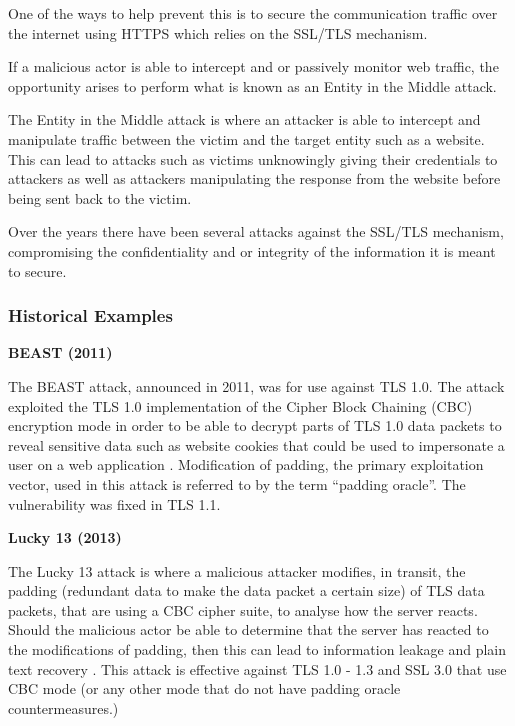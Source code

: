 \documentclass{mscreport}
\begin{document}
\vspace{0.3cm} \noindent
One of the ways to help prevent this is to secure the communication traffic over the internet using HTTPS which relies on the SSL/TLS mechanism.

\vspace{0.3cm} \noindent
If a malicious actor is able to intercept and or passively monitor web traffic, the opportunity arises to perform what is known as an Entity in the Middle attack.

\vspace{0.3cm} \noindent
The Entity in the Middle attack is where an attacker is able to intercept and manipulate traffic between the victim and the target entity such as a website. This can lead to attacks such as victims unknowingly giving their credentials to attackers as well as attackers manipulating the response from the website before being sent back to the victim.

\vspace{0.3cm} \noindent
Over the years there have been several attacks against the SSL/TLS mechanism, compromising the confidentiality and or integrity of the information it is meant to secure.

\subsubsection{Historical Examples}
\textbf{BEAST (2011)}

\vspace{0.2cm} \noindent
The BEAST attack, announced in 2011, was for use against TLS 1.0. The attack exploited the TLS 1.0 implementation of the Cipher Block Chaining (CBC) encryption mode in order to be able to decrypt parts of TLS 1.0 data packets to reveal sensitive data such as website cookies that could be used to impersonate a user on a web application \cite{Ristic2017-aj,Levillain2015-os}. Modification of padding, the primary exploitation vector, used in this attack is referred to by the term ``padding oracle''. The vulnerability was fixed in TLS 1.1.


\vspace{0.6cm} \noindent
\textbf{Lucky 13 (2013)}


\vspace{0.2cm} \noindent
The Lucky 13 attack is where a malicious attacker modifies, in transit, the padding (redundant data to make the data packet a certain size) of TLS data packets, that are using a CBC cipher suite, to analyse how the server reacts. Should the malicious actor be able to determine that the server has reacted to the modifications of padding, then this can lead to information leakage and plain text recovery \cite{Ristic2017-aj,Al_Fardan2013-sw}. This attack is effective against TLS 1.0 - 1.3 and SSL 3.0 that use CBC mode (or any other mode that do not have padding oracle countermeasures.)
\end{document}
